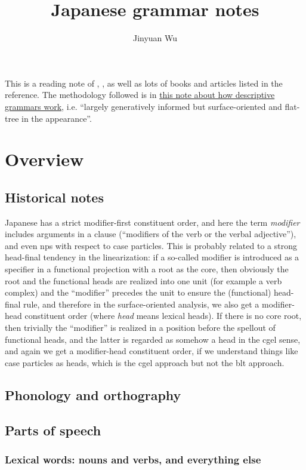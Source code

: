 \documentclass[UTF8, a4paper, oneside, scheme=plain]{ctexart}
\title{Japanese grammar notes}
\author{Jinyuan Wu}
\newcommand*{\term}[1]{\emph{#1}}
\newcommand{\method}{\href{../methodology/glossing.pdf}{this note about how descriptive grammars work}}
\begin{document}
\maketitle

This is a reading note of \citet{akiyama2012japanese}, \citet{tsutsui1989dictionary},
as well as lots of books and articles listed in the reference.
The methodology followed is in \method,
i.e. ``largely generatively informed but surface-oriented and flat-tree in the appearance''.

\section{Overview}

\subsection{Historical notes}

Japanese has a strict modifier-first constituent order,
and here the term \term{modifier} includes 
arguments in a clause (``modifiers of the verb or the verbal adjective''),
and even \acs{np}s with respect to case particles.
This is probably related to a strong head-final tendency in the linearization:
if a so-called modifier is introduced as a specifier 
in a functional projection with a root as the core,
then obviously the root and the functional heads are realized into one unit (for example a verb complex) 
and the ``modifier'' precedes the unit to ensure the (functional) head-final rule,
and therefore in the surface-oriented analysis,
we also get a modifier-head constituent order (where \term{head} means lexical heads).
If there is no core root,
then trivially the ``modifier'' is realized in a position before the spellout of functional heads,
and the latter is regarded as somehow a head in the \acs{cgel} sense,
and again we get a modifier-head constituent order,
if we understand things like case particles as heads,
which is the \ac{cgel} approach but not the \acs{blt} approach.

\subsection{Phonology and orthography}

\subsection{Parts of speech}

\subsubsection{Lexical words: nouns and verbs, and everything else}
\end{document}
